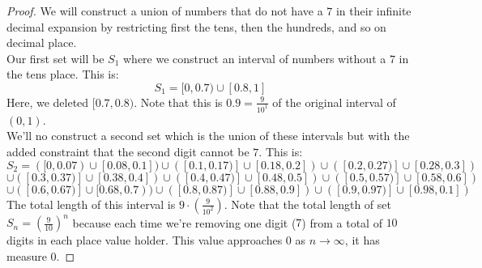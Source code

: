 \documentclass[12pt,oneside]{amsart}
\theoremstyle{definition}
\theoremstyle{remark}
\numberwithin{equation}{exer}
\begin{document}
\begin{proof}
We will construct a union of numbers that do not have a $7$ in their infinite decimal expansion by restricting first the tens, then the hundreds, and so on decimal place. \\
Our first set will be $S_1$ where we construct an interval of numbers without a $7$ in the tens place. This is: $$S_1=[0,0.7)\cup[0.8,1]$$
Here, we deleted $[0.7,0.8)$. Note that this is $0.9=\frac{9}{10^1}$ of the original interval of $(0,1)$. \\
We'll no construct a second set which is the union of these intervals but with the added constraint that the second digit cannot be $7$. This is: 
$$S_2=([0,0.07)\cup[0.08,0.1])\cup([0.1,0.17)]\cup[0.18,0.2])\cup([0.2,0.27)]\cup[0.28,0.3])$$
$$\cup([0.3,0.37)]\cup[0.38,0.4])\cup([0.4,0.47)]\cup[0.48,0.5])\cup([0.5,0.57)]\cup[0.58,0.6])$$ $$\cup([0.6,0.67)]\cup[0.68,0.7))\cup([0.8,0.87)]\cup[0.88,0.9])\cup([0.9,0.97)]\cup[0.98,0.1])$$
The total length of this interval is $9\cdot(\frac{9}{10^2})$. Note that the total length of set $S_n=(\frac{9}{10})^n$ because each time we're removing one digit ($7$) from a total of $10$ digits in each place value holder. This value approaches $0$ as $n\to\infty$, it has measure $0$.
\end{proof}
\end{document}
